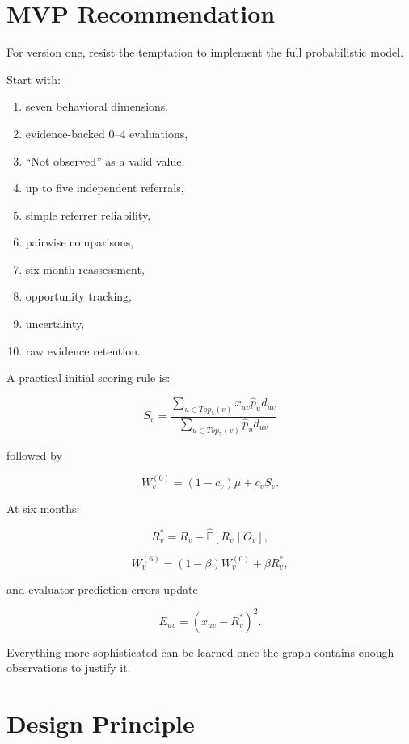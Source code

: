 \documentclass[11pt]{article}
\begin{document}
\section{MVP Recommendation}

For version one, resist the temptation to implement the full probabilistic
model.

Start with:

\begin{enumerate}
    \item seven behavioral dimensions,
    \item evidence-backed \(0\)--\(4\) evaluations,
    \item ``Not observed'' as a valid value,
    \item up to five independent referrals,
    \item simple referrer reliability,
    \item pairwise comparisons,
    \item six-month reassessment,
    \item opportunity tracking,
    \item uncertainty,
    \item raw evidence retention.
\end{enumerate}

A practical initial scoring rule is:

\[
S_v
=
\frac{
\sum_{u \in Top_5(v)}
x_{uv}\hat p_u d_{uv}
}{
\sum_{u \in Top_5(v)}
\hat p_u d_{uv}
}
\]

followed by

\[
W_v^{(0)}
=
(1-c_v)\mu+c_vS_v.
\]

At six months:

\[
R_v^\ast
=
R_v-\widehat{\mathbb{E}}[R_v\mid O_v],
\]

\[
W_v^{(6)}
=
(1-\beta)W_v^{(0)}
+
\beta R_v^\ast,
\]

and evaluator prediction errors update

\[
E_{uv}
=
(x_{uv}-R_v^\ast)^2.
\]

Everything more sophisticated can be learned once the graph contains enough
observations to justify it.

\section{Design Principle}
\end{document}
